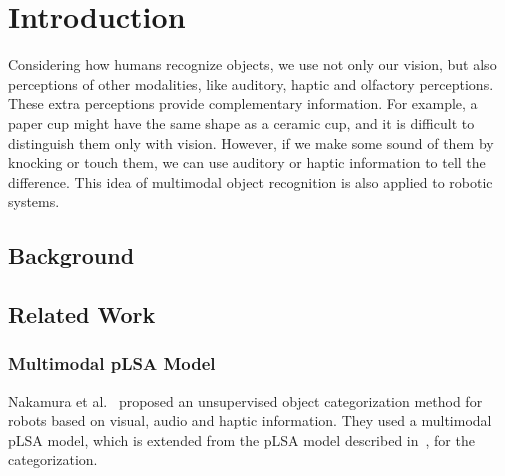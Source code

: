 \documentclass[12pt,final,twoside]{report}
\begin{document}
\chapter{Introduction}
Considering how humans recognize objects, we use not only our vision, but also perceptions of other modalities, like auditory, haptic and olfactory perceptions. These extra perceptions provide complementary information. For example, a paper cup might have the same shape as a ceramic cup, and it is difficult to distinguish them only with vision. However, if we make some sound of them by knocking or touch them, we can use auditory or haptic information to tell the difference. This idea of multimodal object recognition is also applied to robotic systems.

\section{Background}

\section{Related Work}

\subsection{Multimodal pLSA Model}
Nakamura et al.~\cite{nakamura_multimodal_2007} proposed an unsupervised object categorization method for robots based on visual, audio and haptic information. They used a multimodal pLSA model, which is extended from the pLSA model described in~\cite{sivic_discovering_2005}, for the categorization.
\end{document}
